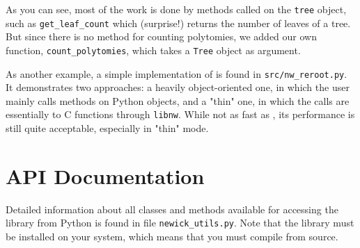 


As you can see, most of the work is done by methods called on the \texttt{tree}
object, such as \texttt{get\_leaf\_count} which (surprise!) returns the number
of leaves of a tree. But since there is no method for counting polytomies, we
added our own function, \texttt{count\_polytomies}, which takes a \texttt{Tree}
object as argument.

As another example, a simple implementation of \reroot{} is found in
\texttt{src/nw\_reroot.py}. It demonstrates two approaches: a heavily
object-oriented one, in which the user mainly calls methods on Python objects,
and a "thin" one, in which the calls are essentially to C functions through
\texttt{libnw}. While not as fast as \reroot{}, its performance is still quite
acceptable, especially in "thin" mode.

\section{API Documentation}

\noindent{}Detailed information about all classes and methods available for accessing the \nutils{} library from Python is found in file \texttt{newick\_utils.py}. Note that the library must be installed on your system, which means that you must compile from source.
